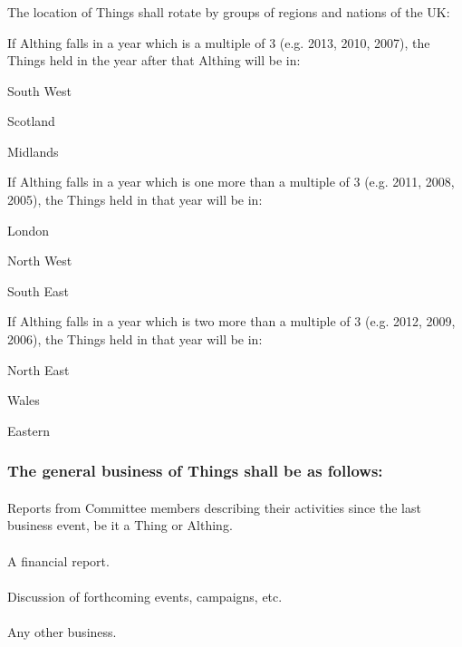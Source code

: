 \documentclass[a4paper, 11pt]{report}
\begin{document}
\subsubsection{}
The location of Things shall rotate by groups of regions and nations of the UK:

If Althing falls in a year which is a multiple of 3 (e.g. 2013, 2010, 2007), the Things held in the year after that Althing will be in:
\begin{itemize*}
\item South West
\item Scotland
\item Midlands
\end{itemize*}

If Althing falls in a year which is one more than a multiple of 3 (e.g. 2011, 2008, 2005), the Things held in that year will be in:
\begin{itemize*}
\item London
\item North West
\item South East
\end{itemize*}

If Althing falls in a year which is two more than a multiple of 3 (e.g. 2012, 2009, 2006), the Things held in that year will be in:
\begin{itemize*}
\item North East
\item Wales
\item Eastern
\end{itemize*}

\subsubsection{The general business of Things shall be as follows:}
\paragraph{}
Reports from Committee members describing their activities since the last business event, be it a Thing or Althing.
\paragraph{}
A financial report.
\paragraph{}
Discussion of forthcoming events, campaigns, etc. 
\paragraph{}
Any other business.
\end{document}

